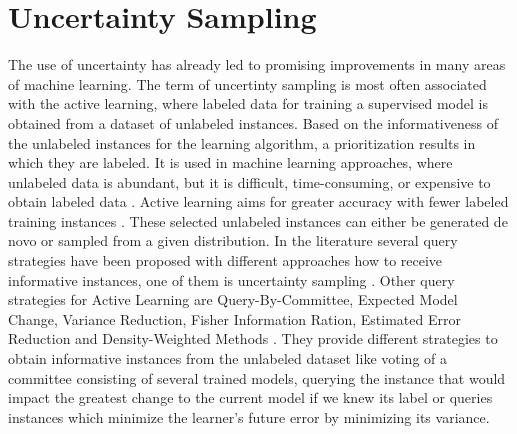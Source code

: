 \section{Uncertainty Sampling} 
\label{sec:uncertaintysampling}
The use of uncertainty has already led to promising improvements in many areas of machine learning.
The term of uncertinty sampling is most often associated with the active learning, where labeled data for training a supervised model is obtained from a dataset of unlabeled instances.
Based on the informativeness of the unlabeled instances for the learning algorithm, a prioritization results in which they are labeled.
It is used in machine learning approaches, where unlabeled data is abundant, but it is difficult, time-consuming, or expensive to obtain labeled data \cite{Settles2009ActiveLL}.
Active learning aims for greater accuracy with fewer labeled training instances \cite{Settles2009ActiveLL}.
These selected unlabeled instances can either be generated de novo or sampled from a given distribution.
In the literature several query strategies have been proposed with different approaches how to receive informative instances, one of them is uncertainty sampling \cite{Settles2009ActiveLL}.
Other query strategies for Active Learning are Query-By-Committee, Expected Model Change, Variance Reduction, Fisher Information Ration, Estimated Error Reduction and Density-Weighted Methods \cite{Settles2009ActiveLL}.
They provide different strategies to obtain informative instances from the unlabeled dataset like voting of a committee consisting of several trained models, querying the instance that would impact the greatest change to the current model if we knew its label or queries instances which minimize the learner’s future error by minimizing its variance.

